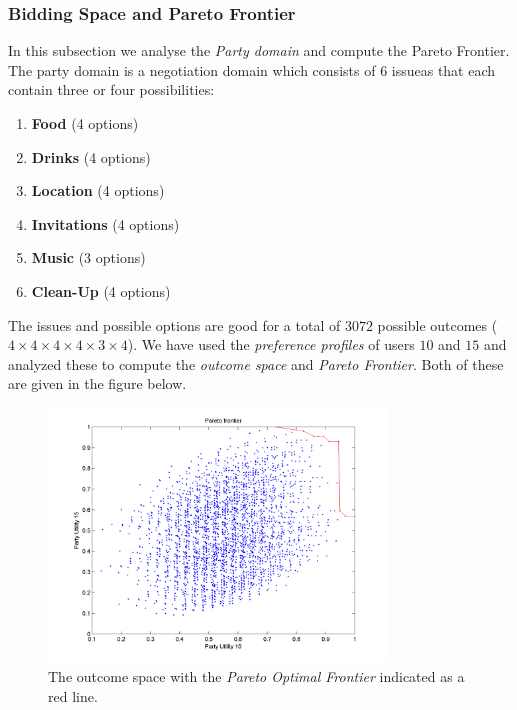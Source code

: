 \documentclass[a4paper,10pt]{article}
\begin{document}
\subsubsection{Bidding Space and Pareto Frontier}

In this subsection we analyse the \emph{Party domain} and compute the Pareto Frontier. The party domain is a negotiation domain which consists of $6$ issueas that each contain three or four possibilities: 

\begin{enumerate}[itemsep=0mm]
  \item \textbf{Food} (4 options)
  \item \textbf{Drinks} (4 options)
  \item \textbf{Location} (4 options)
  \item \textbf{Invitations} (4 options)
  \item \textbf{Music} (3 options)
  \item \textbf{Clean-Up} (4 options)
\end{enumerate}

The issues and possible options are good for a total of $3072$ possible outcomes ($4 \times 4 \times 4 \times 4 \times 3 \times 4$). We have used the \emph{preference profiles} of users $10$ and $15$ and analyzed these to compute the \emph{outcome space} and \emph{Pareto Frontier}. Both of these are given in the figure below.

\begin{figure}[H]
\begin{center}
 \includegraphics[width=0.8\textwidth]{pareto.png}
 \caption{The outcome space with the \emph{Pareto Optimal Frontier} indicated as a red line.}
 \label{fig:pareto} 
\end{center}
\end{figure}
\end{document}
